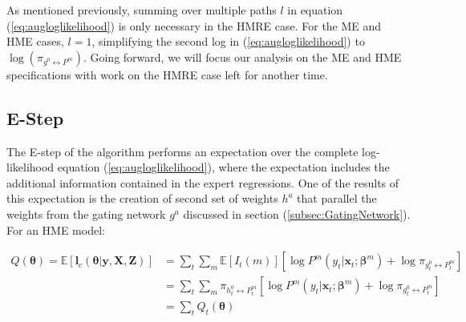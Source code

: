 \documentclass[12pt]{article}
\newcommand{\gateprod}[2]{\pi_{#1 \longleftrightarrow #2}}
\begin{document}
As mentioned previously, summing over multiple paths $l$ in equation
(\ref{eq:augloglikelihood}) is only necessary in the HMRE case. For the ME
and HME cases, $l = 1$, simplifying the second log in (\ref{eq:augloglikelihood})
to $\log(\gateprod{g^{0}}{P^{m}})$. Going forward, we will focus our analysis on
the ME and HME specifications with work on the HMRE case left for another time.




\subsection{E-Step}
The E-step of the algorithm performs an expectation over the complete
log-likelihood equation (\ref{eq:augloglikelihood}), where the expectation
includes the additional information contained in the expert regressions.
One of the results of this expectation is the creation of second set of
weights $h^{a}$ that parallel the weights from the gating network $g^{a}$
discussed in section (\ref{subsec:GatingNetwork}). For an HME model:

\begin{equation} \label{eq:Estep}
  \begin{split}
  Q(\boldsymbol{\theta}) = \mathbb{E} \left [ \boldsymbol{l}_{c}(\boldsymbol{\theta}| \boldsymbol{y}, \boldsymbol{X}, \boldsymbol{Z}) \right] & = \sum_{t}\sum_{m} \mathbb{E} \left[ I_{t}(m) \right] \left[ \log P^{m}(y_{t}| \boldsymbol{x}_{t}; \boldsymbol{\beta}^{m}) + \log \gateprod{g^{0}_{t}}{P^{m}_{t}} \right] \\ 
   & = \sum_{t} \sum_{m} \gateprod{h^{0}_{t}}{P^{m}_{t}} \left[ \log P^{m}(y_{t}| \boldsymbol{x}_{t}; \boldsymbol{\beta}^{m}) + \log \gateprod{g^{0}_{t}}{P^{m}_{t}} \right] \\
   & = \sum_{t} Q_{t}(\boldsymbol{\theta})
 \end{split}
\end{equation}
\end{document}
